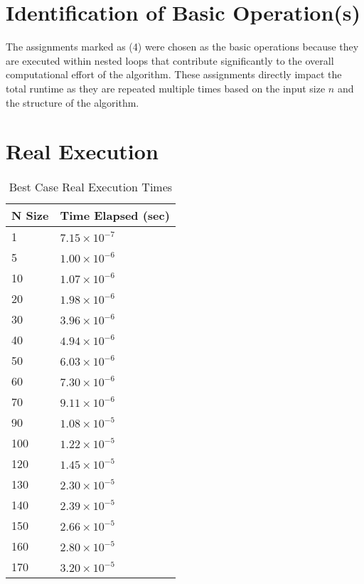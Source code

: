 \documentclass[11pt, oneside, a4paper]{article}
\begin{document}
	\section{Identification of Basic Operation(s)}

The assignments marked as (4) were chosen as the basic operations because they are executed within nested loops that contribute significantly to the overall computational effort of the algorithm. These assignments directly impact the total runtime as they are repeated multiple times based on the input size \( n \) and the structure of the algorithm. 

	\section{Real Execution}

	\begin{table}[H]
		\centering
		\begin{tabular}{|l|l|} \hline
			\textbf{N Size} & \textbf{Time Elapsed (sec)} \\ \hline
			1 & \( 7.15 \times 10^{-7}\) \\ \hline
			5 & \( 1.00 \times 10^{-6}\) \\ \hline
			10 & \( 1.07 \times 10^{-6}\) \\ \hline
			20 & \( 1.98 \times 10^{-6}\) \\ \hline
			30 & \( 3.96 \times 10^{-6}\) \\ \hline
			40 & \( 4.94 \times 10^{-6}\) \\ \hline
			50 & \( 6.03 \times 10^{-6}\) \\ \hline
			60 & \( 7.30 \times 10^{-6}\) \\ \hline
			70 & \( 9.11 \times 10^{-6}\) \\ \hline
			90 & \( 1.08 \times 10^{-5}\) \\ \hline
			100 & \( 1.22 \times 10^{-5}\) \\ \hline
			120 & \( 1.45 \times 10^{-5}\) \\ \hline
			130 & \( 2.30 \times 10^{-5}\) \\ \hline
			140 & \( 2.39 \times 10^{-5}\) \\ \hline
			150 & \( 2.66 \times 10^{-5}\) \\ \hline
			160 & \( 2.80 \times 10^{-5}\) \\ \hline
			170 & \( 3.20 \times 10^{-5}\) \\ \hline
		\end{tabular}
		\caption{Best Case Real Execution Times}
		\label{tab:best-case}
	\end{table}
\end{document}
